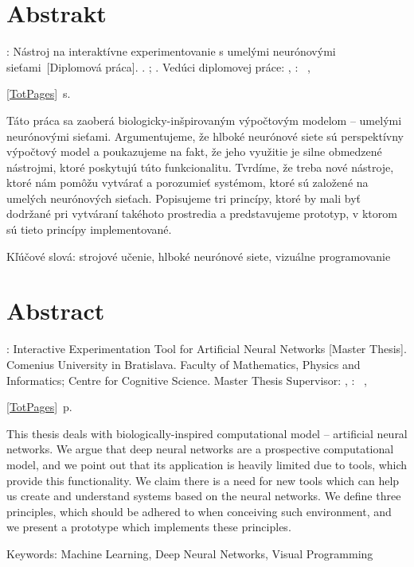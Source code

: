 \chapter{Abstrakt}

\authorAbstract: Nástroj na interaktívne experimentovanie s umelými neurónovými sieťami\ [Diplomová práca]. \university. \faculty; \educationalDepartment. Vedúci diplomovej práce: \advisor, \place: \facultyShort\ \universityShort, \date. \ref{TotPages}~s.

\bigskip

Táto práca sa zaoberá biologicky-inšpirovaným výpočtovým modelom -- umelými neurónovými sieťami. Argumentujeme, že hlboké neurónové siete sú perspektívny výpočtový model a poukazujeme na fakt, že jeho využitie je silne obmedzené nástrojmi, ktoré poskytujú túto funkcionalitu. Tvrdíme, že treba nové nástroje, ktoré nám pomôžu vytvárať a porozumieť systémom, ktoré sú založené na umelých neurónových sieťach. Popisujeme tri princípy, ktoré by mali byť dodržané pri vytváraní takéhoto prostredia a predstavujeme prototyp, v ktorom sú tieto princípy implementované.

\bigskip

\noindent Kľúčové slová: strojové učenie, hlboké neurónové siete, vizuálne programovanie

\chapter*{Abstract}

\authorAbstract: Interactive Experimentation Tool for Artificial Neural Networks [Master Thesis]. Comenius University in Bratislava. Faculty of Mathematics, Physics and Informatics; Centre for Cognitive Science. Master Thesis Supervisor: \advisor, \place: \facultyShort\ \universityShort, \date. \ref{TotPages}~p.

\bigskip

This thesis deals with biologically-inspired computational model -- artificial neural networks. We argue that deep neural networks are a prospective computational model, and we point out that its application is heavily limited due to tools, which provide this functionality. We claim there is a need for new tools which can help us create and understand systems based on the neural networks. We define three principles, which should be adhered to when conceiving such environment, and we present a prototype which implements these principles.

\bigskip

\noindent Keywords: Machine Learning, Deep Neural Networks, Visual Programming